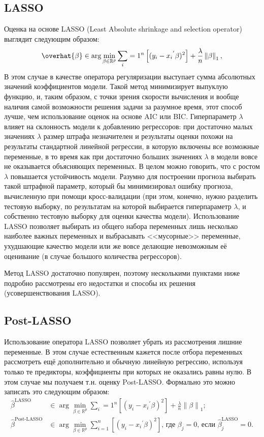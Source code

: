 \subsection{LASSO}
Оценка на основе LASSO (Least Absolute shrinkage and selection operator) выглядит следующим образом:
\begin{equation}
\overhat{\beta} \in \arg \min_{\beta \in
\mathbb{R}^p} \sum_i=1^n \left[ (y_i - {x_i}^{'} \beta)^2 \right] +  \frac{\lambda}{n} \left\lVert \beta \right\rVert_1,
\end{equation}
В этом случае в качестве оператора регуляризации выступает сумма абсолютных значений коэффициентов модели.
Такой метод минимизирует выпуклую функцию, и, таким образом, с точки зрения скорости вычисления и вообще наличия самой возможности решения задачи за разумное время, этот способ лучше, чем использование оценок на основе AIC или BIC. Гиперпараметр $\lambda$ влияет на склонность модели к добавлению регрессоров: при достаточно малых значениях $\lambda$ размер штрафа незначителен и результаты оценки похожи на результаты стандартной линейной регрессии, в которую включены все возможные переменные, в то время как при достаточно больших значениях $\lambda$ в модели вовсе не оказывается объясняющих переменных. В целом можно говорить, что с ростом $\lambda$ повышается устойчивость модели. Разумно для построении прогноза выбирать такой штрафной параметр, который бы минимизировал ошибку прогноза, вычисленную при помощи кросс-валидации (при этом, конечно, нужно разделить тестовую выборку, по результатам на которой выбирается гиперпараметр $\lambda$, и собственно тестовую выборку для оценки качества модели). Использование LASSO позволяет выбирать из общего набора переменных лишь несколько наиболее важных переменных и выбрасывать <<мусорные>> переменные, ухудшающие качество модели или же вовсе делающие невозможным её оценивание (в случае большого количества регрессоров).


Метод LASSO достаточно популярен, поэтому несколькими пунктами ниже подробно рассмотрены его недостатки и способы их решения (усовершенствования LASSO).

\subsection{Post-LASSO}

Использование оператора LASSO позволяет убрать из рассмотрения лишние переменные. В этом случае естественным кажется после отбора переменных рассмотреть ещё дополнительно и обычную линейную регрессию, используя только те предикторы, коэффициенты при которых не оказались равны нулю. В этом случае мы получаем т.н. оценку Post-LASSO. Формально это можно записать это следующим образом:
\begin{align}
    \hat{\beta}^{\text{LASSO}} &\in \arg \min_{\beta \in
\mathbb{R}^p} \sum_i=1^n \left[ (y_i - {x_i}^{'} \beta)^2 \right] +  \frac{\lambda}{n} \left\lVert \beta \right\rVert_1; \\
  \hat{\beta}^{\text{Post-LASSO}} &\in \arg \min_{\beta \in
\mathbb{R}^p} \sum_{i=1}^n \left[ (y_i - {x_i}^{'} \beta)^2 \right] \text{,  где }  \beta_j = 0 \text{, если } \hat{\beta}^{\text{LASSO}}_j = 0.
\end{align}

